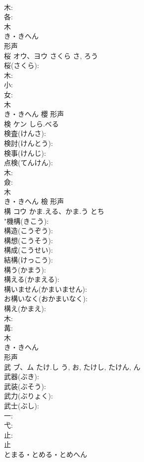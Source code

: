 \documentclass[8pt]{extreport}
\begin{document}
\begin{CJK}{UTF8}{min}
\\	木: 
\\	各: 
\\	木	
\\	き・きへん	
\\	形声 
\\	桜	オウ、ヨウ	さくら	さ, ろう	
\\	桜(さくら): 
\\	木: 
\\	小: 
\\	女: 
\\	木	
\\	き・きへん	櫻	形声 
\\	検	ケン	しら.べる		
\\	検査(けんさ): 
\\	検討(けんとう): 
\\	検事(けんじ): 
\\	点検(てんけん): 
\\	木: 
\\	僉: 
\\	木	
\\	き・きへん	檢	形声 
\\	構	コウ	かま.える、かま.う	とち	
\\	"機構(きこう): 
\\	構造(こうぞう): 
\\	構想(こうそう): 
\\	構成(こうせい): 
\\	結構(けっこう): 
\\	構う(かまう): 
\\	構える(かまえる): 
\\	構いません(かまいません): 
\\	お構いなく(おかまいなく): 
\\	構え(かまえ): 
\\	木: 
\\	冓: 
\\	木	
\\	き・きへん	
\\	形声 
\\	武	ブ、ム	たけ.し	う, お, たけし, たけん, ん	
\\	武器(ぶき): 
\\	武装(ぶそう): 
\\	武力(ぶりょく): 
\\	武士(ぶし): 
\\	一: 
\\	弋: 
\\	止: 
\\	止	
\\	とまる・とめる・とめへん	

\end{CJK}
\end{document}
